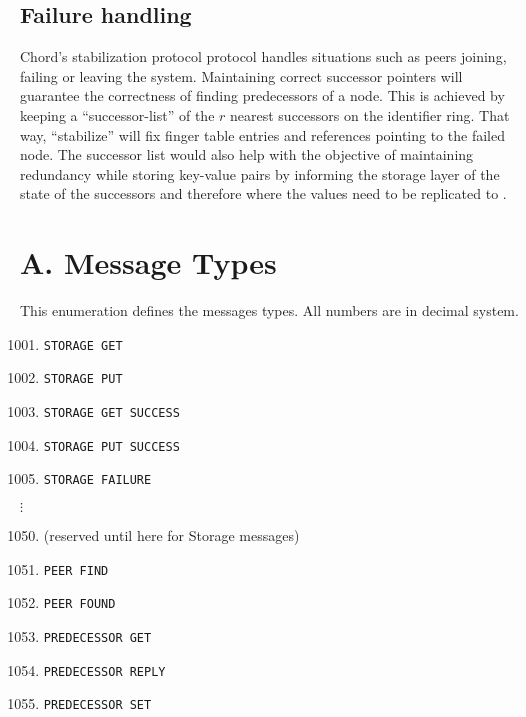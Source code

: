\documentclass[a4paper, 11pt]{article}
\begin{document}
\subsection*{Failure handling}
Chord's stabilization protocol protocol handles situations such as peers joining, failing or leaving the system. Maintaining correct successor pointers will guarantee the correctness of finding predecessors of a node. This is achieved by keeping a ``successor-list'' of the $r$ nearest successors on the identifier ring. That way, ``stabilize'' will fix finger table entries and references pointing to the failed node. The successor list would also help with the objective of maintaining redundancy while storing key-value pairs by informing the storage layer of the state of the successors and therefore where the values need to be replicated to \cite{Chord}. 





\pagebreak

\section*{A. Message Types}
This enumeration defines the messages types. All numbers are in decimal system.
\begin{enumerate}
	\setcounter{enumi}{1000}
	\item \texttt{STORAGE GET}
	\item \texttt{STORAGE PUT}
	\item \texttt{STORAGE GET SUCCESS}
	\item \texttt{STORAGE PUT SUCCESS}
	\item \texttt{STORAGE FAILURE}
\end{enumerate}
$\vdots$
\begin{enumerate}
	\setcounter{enumi}{1049}
	\item (reserved until here for Storage messages)
	\item \texttt{PEER FIND}
	\item \texttt{PEER FOUND}
	\item \texttt{PREDECESSOR GET}
	\item \texttt{PREDECESSOR REPLY}
	\item \texttt{PREDECESSOR SET}
\end{enumerate}
\end{document}
